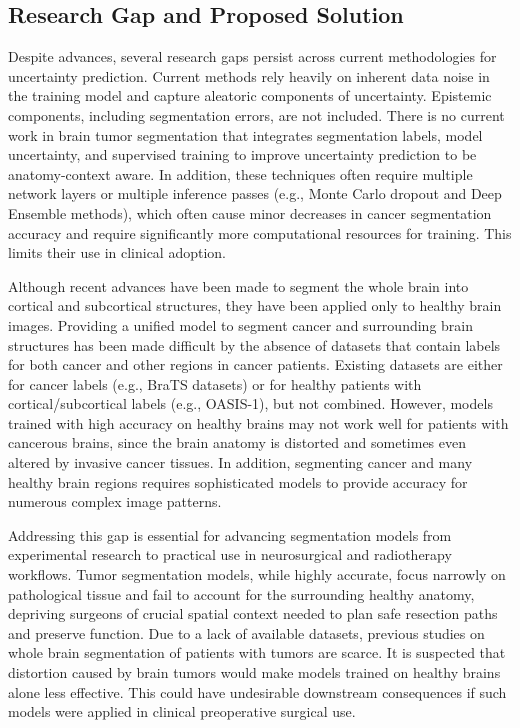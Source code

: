 \documentclass[11pt,letterpaper]{article}
\begin{document}
\subsection{Research Gap and Proposed Solution}
Despite advances, several research gaps persist across current methodologies for uncertainty prediction. Current methods rely heavily on inherent data noise in the training model and capture aleatoric components of uncertainty. Epistemic components, including segmentation errors, are not included. There is no current work in brain tumor segmentation that integrates segmentation labels, model uncertainty, and supervised training to improve uncertainty prediction to be anatomy-context aware. In addition, these techniques often require multiple network layers or multiple inference passes (e.g., Monte Carlo dropout and Deep Ensemble methods), which often cause minor decreases in cancer segmentation accuracy and require significantly more computational resources for training. This limits their use in clinical adoption.

Although recent advances have been made to segment the whole brain into cortical and subcortical structures, they have been applied only to healthy brain images. Providing a unified model to segment cancer and surrounding brain structures has been made difficult by the absence of datasets that contain labels for both cancer and other regions in cancer patients. Existing datasets are either for cancer labels (e.g., BraTS datasets) or for healthy patients with cortical/subcortical labels (e.g., OASIS-1), but not combined. However, models trained with high accuracy on healthy brains may not work well for patients with cancerous brains, since the brain anatomy is distorted and sometimes even altered by invasive cancer tissues. In addition, segmenting cancer and many healthy brain regions requires sophisticated models to provide accuracy for numerous complex image patterns.

Addressing this gap is essential for advancing segmentation models from experimental research to practical use in neurosurgical and radiotherapy workflows. Tumor segmentation models, while highly accurate, focus narrowly on pathological tissue and fail to account for the surrounding healthy anatomy, depriving surgeons of crucial spatial context needed to plan safe resection paths and preserve function. Due to a lack of available datasets, previous studies on whole brain segmentation of patients with tumors are scarce. It is suspected that distortion caused by brain tumors would make models trained on healthy brains alone less effective. This could have undesirable downstream consequences if such models were applied in clinical preoperative surgical use.
\end{document}
